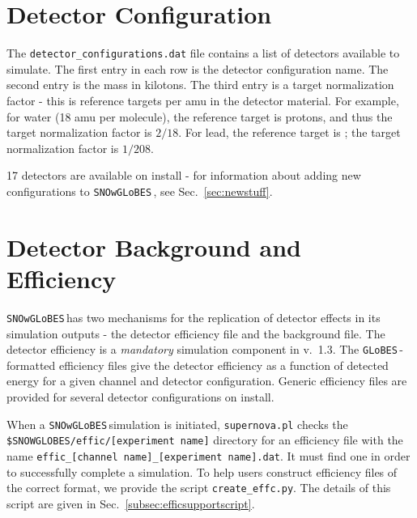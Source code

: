 \documentclass{article}
\newcommand{\snow}{\texttt{SNOwGLoBES}\,}
\newcommand{\glb}{\texttt{GLoBES}\,}
\begin{document}
\section{Detector Configuration} \label{sec:det.config}

The \texttt{detector\_configurations.dat} file contains a list of detectors available to simulate.  The first entry in each row is the detector configuration name. The second entry is the mass in kilotons. The third entry is a target normalization factor - this is
reference targets per amu in the detector material. For example, for water (18 amu per molecule), the reference target is protons, and thus the target normalization factor is $2/18$. For lead, the reference target is ; the target normalization factor is $1/208$.

17 detectors are available on install - for information about adding new configurations to \snow, see Sec.~\ref{sec:newstuff}.

\section{Detector Background and Efficiency}\label{sec:bkg&effic}

\snow has two mechanisms for the replication of detector effects in its simulation outputs - the detector efficiency file and the background file. The detector efficiency is a \textit{mandatory} simulation component in v.~1.3. The \glb-formatted efficiency files give the detector efficiency as a function of detected energy for a given channel and detector configuration. Generic efficiency files are provided for several detector configurations on install.

When a \snow simulation is initiated, \texttt{supernova.pl} checks the \texttt{\$SNOWGLOBES/effic/[experiment name]} directory for an efficiency file with the name \texttt{effic\_[channel name]\_[experiment name].dat}. It must find one in order to successfully complete a simulation. To help users construct efficiency files of the correct format, we provide the script \texttt{create\_effc.py}. The details of this script are given in Sec.~\ref{subsec:efficsupportscript}.
\end{document}
